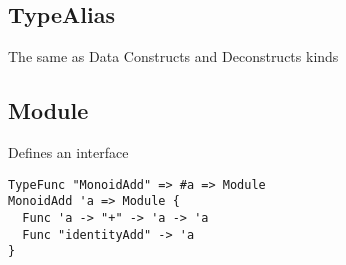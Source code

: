 \subsection{TypeAlias}

The same as Data
Constructs and Deconstructs kinds

\subsection{Module}
Defines an interface
\begin{lstlisting}
TypeFunc "MonoidAdd" => #a => Module
MonoidAdd 'a => Module {
  Func 'a -> "+" -> 'a -> 'a
  Func "identityAdd" -> 'a
}
\end{lstlisting}
